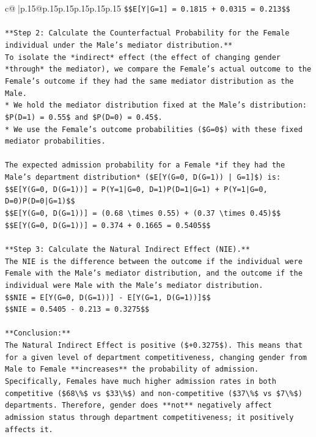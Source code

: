 \documentclass{article}
\begin{document}
{\begin{supertabular}{c@{$\;$}|p{.15\linewidth}@{}p{.15\linewidth}p{.15\linewidth}p{.15\linewidth}p{.15\linewidth}p{.15\linewidth}}
{{{\texttt{\$\$E{[}Y|G=1{]} = 0.1815 + 0.0315 = 0.213\$\$} \\
\\ 
\texttt{**Step 2: Calculate the Counterfactual Probability for the Female individual under the Male's mediator distribution.**} \\
\texttt{To isolate the *indirect* effect (the effect of changing gender *through* the mediator), we compare the Female's actual outcome to the Female's outcome if they had the same mediator distribution as the Male.} \\
\texttt{*   We hold the mediator distribution fixed at the Male's distribution: \$P(D=1) = 0.55\$ and \$P(D=0) = 0.45\$.} \\
\texttt{*   We use the Female's outcome probabilities (\$G=0\$) with these fixed mediator probabilities.} \\
\\ 
\texttt{The expected admission probability for a Female *if they had the Male's department distribution* (\$E{[}Y(G=0, D(G=1)) | G=1{]}\$) is:} \\
\texttt{\$\$E{[}Y(G=0, D(G=1)){]} = P(Y=1|G=0, D=1)P(D=1|G=1) + P(Y=1|G=0, D=0)P(D=0|G=1)\$\$} \\
\texttt{\$\$E{[}Y(G=0, D(G=1)){]} = (0.68 \textbackslash{}times 0.55) + (0.37 \textbackslash{}times 0.45)\$\$} \\
\texttt{\$\$E{[}Y(G=0, D(G=1)){]} = 0.374 + 0.1665 = 0.5405\$\$} \\
\\ 
\texttt{**Step 3: Calculate the Natural Indirect Effect (NIE).**} \\
\texttt{The NIE is the difference between the outcome if the individual were Female with the Male's mediator distribution, and the outcome if the individual were Male with the Male's mediator distribution.} \\
\texttt{\$\$NIE = E{[}Y(G=0, D(G=1)){]} {-} E{[}Y(G=1, D(G=1)){]}\$\$} \\
\texttt{\$\$NIE = 0.5405 {-} 0.213 = 0.3275\$\$} \\
\\ 
\texttt{**Conclusion:**} \\
\texttt{The Natural Indirect Effect is positive (\$+0.3275\$). This means that for a given level of department competitiveness, changing gender from Male to Female **increases** the probability of admission. Specifically, Females have much higher admission rates in both competitive (\$68\textbackslash{}\%\$ vs \$33\textbackslash{}\%\$) and non{-}competitive (\$37\textbackslash{}\%\$ vs \$7\textbackslash{}\%\$) departments. Therefore, gender does **not** negatively affect admission status through department competitiveness; it positively affects it.} \\
}}}
\end{supertabular}}
\end{document}
